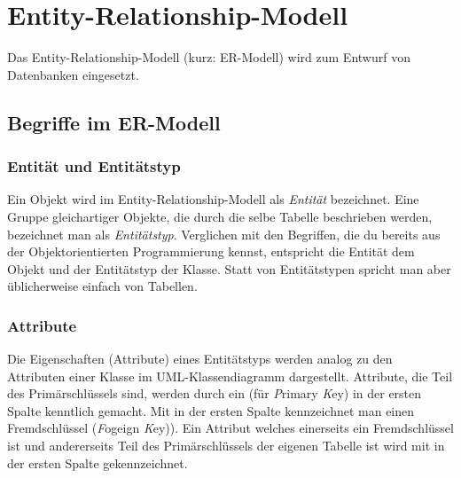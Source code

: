 \chapter{Entity-Relationship-Modell}
\renewcommand{\chaptertitle}{Entity-Relationship-Modell}

\lehead[]{\normalfont\sffamily\hspace*{-2.00cm}\textcolor{white}{\colorbox{lightblue}{\makebox[1.60cm][r]{\thechapter}}}\hspace{0.17cm}\textcolor{lightblue}{\chaptertitle}}
\rohead[]{\textcolor{lightblue}{\chaptertitle}\normalfont\sffamily\hspace*{0.17cm}\textcolor{white}{\colorbox{lightblue}{\makebox[1.60cm][l]{\thechapter}}}\hspace{-2.00cm}}
\rehead[]{\textcolor{lightblue}{AvHG, Inf, My}}
\lohead[]{\textcolor{lightblue}{AvHG, Inf, My}}


Das Entity-Relationship-Modell (kurz: ER-Modell) wird zum Entwurf von
Datenbanken eingesetzt.

\section{Begriffe im ER-Modell}

\subsection{Entität und Entitätstyp}

Ein Objekt wird im Entity-Relationship-Modell als \textit{Entität} bezeichnet.
Eine Gruppe gleichartiger Objekte, die durch die selbe Tabelle beschrieben 
werden, bezeichnet man als \textit{Entitätstyp}. Verglichen mit den Begriffen, 
die du bereits aus der Objektorientierten Programmierung kennst, entspricht die 
Entität dem Objekt und der Entitätstyp der Klasse. Statt von Entitätstypen
spricht man aber üblicherweise einfach von Tabellen.

\subsection{Attribute}

Die Eigenschaften (Attribute) eines Entitätstyps werden analog zu den Attributen
einer Klasse im UML-Klassendiagramm dargestellt. Attribute, die Teil des
Primärschlüssels sind, werden durch ein  (für
\textit{P}rimary \textit{K}ey) in der ersten Spalte kenntlich gemacht. Mit
 in der ersten Spalte kennzeichnet man einen Fremdschlüssel
(\textit{F}ogeign \textit{K}ey)). Ein Attribut welches einerseits ein
Fremdschlüssel ist und andererseits Teil des Primärschlüssels der eigenen
Tabelle ist wird mit  in der ersten Spalte gekennzeichnet.

